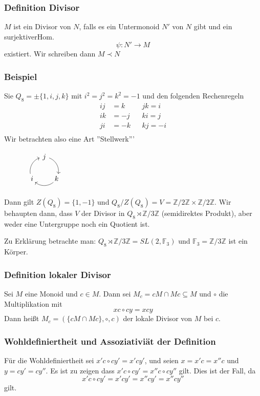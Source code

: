 \documentclass[12pt, german]{article}
\newcommand{\Z}{\mathbb{Z}}
\begin{document}
	\subsubsection{Definition Divisor}
	$M$ ist ein Divisor von $N$, falls es ein Untermonoid $N'$ von $N$ gibt und ein surjektiverHom. $$\psi: N' \to M$$ existiert. Wir schreiben dann $M \prec N$
	
	\subsubsection{Beispiel}
	Sie $Q_8 = \pm \{1, i ,j, k\}$ mit $i^2 = j^2 = k^2 = -1$ und den folgenden Rechenregeln
	\begin{align*}
		ij &= k && jk = i  \\ 
		ik&=-j 	&& ki = j \\
		ji&= -k && kj = -i \\
	\end{align*}
	Wir betrachten also eine Art ''Stellwerk'''
	\begin{figure}[h!]
		\centering
		$ \begin{array}{ccc}
			\begin{tikzpicture}[->,scale=.7] 
				\foreach \a/\t in {90/j,-30/k,210/i}{
					\node (\t) at (\a:1cm) {$\t$};
					\draw (\a-20:1cm)  arc (\a-20:\a-100:1cm);
				} 
			\end{tikzpicture}
		\end{array}$
	\end{figure}
	
	Dann gilt $Z(Q_8) = \{1, -1\}$ und $Q_8/Z(Q_8) = V = \Z/2\Z \times\Z/2\Z$.
	Wir behaupten dann, dass $V$ der Divisor in $Q_8  \rtimes \Z / 3\Z$ (semidirektes Produkt), aber weder eine Untergruppe noch ein Quotient ist.
	
	Zu Erklärung betrachte man: $Q_8  \rtimes \Z / 3\Z = SL(2, \mathbb{F}_3)$ und $\mathbb{F}_3 = \Z / 3\Z$ ist ein Körper.
	
	\subsubsection{Definition lokaler Divisor}
	Sei $M$ eine Monoid und $c \in M$. Dann sei $M_c = cM \cap Mc \subseteq M$ und $\circ$ die Multiplikation mit $$xc \circ cy = xcy$$
	Dann heißt $M_c = (\{cM \cap Mc\}, \circ, c)$ der lokale Divisor von $M$ bei $c$.
	
	\subsubsection{Wohldefiniertheit und Assoziativiät der Definition}
	Für die Wohldefiniertheit sei $x'c \circ cy' = x'cy'$, und seien $x = x'c = x''c$ und $y = cy' = cy''$. Es ist zu zeigen dass $x'c \circ cy' = x''c \circ cy''$ gilt. Dies ist der Fall, da $$x'c \circ cy' = x'cy' = x''cy' = x''cy''$$ gilt. 
	
\end{document}
